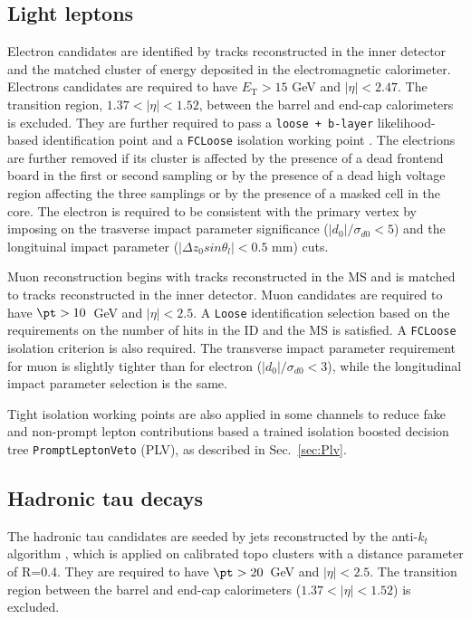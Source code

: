 \subsection{Light leptons}
Electron candidates are identified by tracks reconstructed in the inner detector and the matched cluster of energy deposited in the electromagnetic calorimeter. Electrons candidates are required to have $E_{\text{T}} > 15$ GeV and $|\eta|<2.47$. The transition region, $1.37<|\eta|<1.52$, between the barrel and end-cap calorimeters is excluded. They are further required to pass a \texttt{loose + b-layer} likelihood-based identification point \cite{ElectronID} and a \texttt{FCLoose} isolation working point \cite{IsolationWP}. The electrions are further removed  if its cluster is affected by the presence of a dead frontend board in the first or second sampling or by the presence of a dead high voltage region affecting the three samplings or by the presence of a masked cell in the core. The electron is required to be consistent with the primary vertex by imposing on the trasverse impact parameter significance ($|d_0|/\sigma_{d0}<5$) and 
the longituinal impact parameter ($|\Delta z_0 sin\theta_l|<0.5$ mm) cuts. 

Muon reconstruction begins with tracks reconstructed in the MS and is matched to tracks reconstructed in the inner detector. Muon candidates are required to have $\pt>10$~GeV and $|\eta|<2.5$. A \texttt{Loose} identification selection \cite{MuonSelectionTool} based on the requirements on the number of hits in the ID and the MS is satisfied. A \texttt{FCLoose} isolation \cite{IsolationWP} criterion is also required. The transverse impact parameter requirement for muon is slightly tighter than for electron ($|d_0|/\sigma_{d0}<3$), while the longitudinal impact
parameter selection is the same. 

Tight isolation working points are also applied in some channels to reduce fake and non-prompt lepton contributions based a trained isolation boosted decision tree \texttt{PromptLeptonVeto} 
(PLV), as described in Sec.~\ref{sec:Plv}.

\subsection{Hadronic tau decays}
\label{sec:taurecon}
The hadronic tau candidates \cite{tau_sys1} are seeded by jets reconstructed by the anti-$k_t$ algorithm \cite{antikt}, which is applied on calibrated topo clusters \cite{topocluster} with a distance parameter of R=0.4. They are required to have $\pt > 20$~GeV and $|\eta|<2.5$. The transition region between the barrel and end-cap calorimeters ($1.37<|\eta|<1.52$) is excluded.

